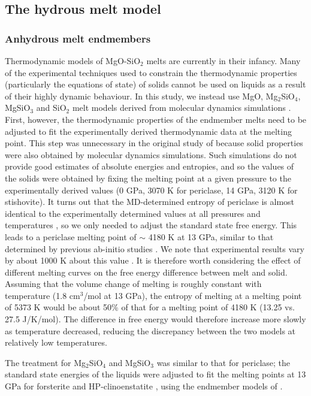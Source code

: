 \documentclass[review]{elsarticle}
\begin{document}
\subsection{The hydrous melt model}
\subsubsection{Anhydrous melt endmembers}
Thermodynamic models of MgO-SiO$_2$ melts are currently in their infancy. Many of the experimental techniques used to constrain the thermodynamic properties (particularly the equations of state) of solids cannot be used on liquids as a result of their highly dynamic behaviour. In this study, we instead use MgO, Mg$_2$SiO$_4$, MgSiO$_3$ and SiO$_2$ melt models derived from molecular dynamics simulations \citep{DKS2013}. First, however, the thermodynamic properties of the endmember melts need to be adjusted to fit the experimentally derived thermodynamic data at the melting point. This step was unnecessary in the original study of \cite{DKS2013} because solid properties were also obtained by molecular dynamics simulations. Such simulations do not provide good estimates of absolute energies and entropies, and so the values of the solids were obtained by fixing the melting point at a given pressure to the experimentally derived values (0 GPa, 3070 K for periclase, 14 GPa, 3120 K for stishovite). It turns out that the MD-determined entropy of periclase is almost identical to the experimentally determined values at all pressures and temperatures \citep{SLB2011}, so we only needed to adjust the standard state free energy. This leads to a periclase melting point of $\sim$ 4180 K at 13 GPa, similar to that determined by previous ab-initio studies \citep{Alfe2005}. We note that experimental results vary by about 1000 K about this value \citep[3100 -- 5373 K at 13 GPa;][]{ZB1994,ZF2008}. It is therefore worth considering the effect of different melting curves on the free energy difference between melt and solid. Assuming that the volume change of melting is roughly constant with temperature (1.8 cm$^3$/mol at 13 GPa), the entropy of melting at a melting point of 5373 K would be about 50\% of that for a melting point of 4180 K (13.25 vs. 27.5 J/K/mol). The difference in free energy would therefore increase more slowly as temperature decreased, reducing the discrepancy between the two models at relatively low temperatures. 

The treatment for Mg$_2$SiO$_4$ and MgSiO$_3$ was similar to that for periclase; the standard state energies of the liquids were adjusted to fit the melting points at 13 GPa for forsterite \citep[2290 $^{\circ}$C][]{PW1993} and HP-clinoenstatite \citep[2240 $^{\circ}$C][]{PG1990}, using the endmember models of \cite{SLB2011}.
\end{document}
